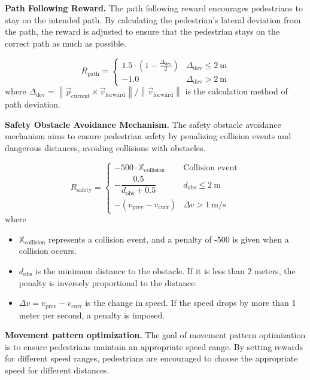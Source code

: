 \documentclass[lettersize,journal]{IEEEtran}
\begin{document}
\textbf{Path Following Reward.}
%
The path following reward encourages pedestrians to stay on the intended path. 
By calculating the pedestrian's lateral deviation from the path, the reward is adjusted to ensure that the pedestrian stays on the correct path as much as possible.

\begin{equation}
	R_{\text{path}} =
	\begin{cases}
		1.5 \cdot \left(1 - \frac{\Delta_{\text{dev}}}{2}\right) & \Delta_{\text{dev}} \leq 2\ \text{m} \\
		-1.0 & \Delta_{\text{dev}} > 2\ \text{m}
	\end{cases}
\end{equation}
where \( \Delta_{\text{dev}} = \left\| \vec{p}_{\text{current}} \times \vec{v}_{\text{forward}} \right\| / \left\| \vec{v}_{\text{forward}} \right\| \) is the calculation method of path deviation.



\textbf{Safety Obstacle Avoidance Mechanism.}
The safety obstacle avoidance mechanism aims to ensure pedestrian safety by penalizing collision events and dangerous distances, avoiding collisions with obstacles.

\begin{equation}
	R_{\text{safety}} =
	\begin{cases}
		-500 \cdot \mathbb{X}_{\text{collision}} & \text{Collision event} \\
		-\dfrac{0.5}{d_{\text{obs}} + 0.5} & d_{\text{obs}} \leq 2\ \text{m} \\
		-(v_{\text{prev}} - v_{\text{curr}}) & \Delta v > 1\ \text{m/s}
	\end{cases}
\end{equation}
where
\begin{itemize}
	\item \( \mathbb{X}_{\text{collision}} \) represents a collision event, and a penalty of -500 is given when a collision occurs.
	\item \( d_{\text{obs}} \) is the minimum distance to the obstacle. If it is less than 2 meters, the penalty is inversely proportional to the distance.
	\item \( \Delta v = v_{\text{prev}} - v_{\text{curr}} \) is the change in speed. If the speed drops by more than 1 meter per second, a penalty is imposed.
\end{itemize}


\textbf{Movement pattern optimization.}
%
The goal of movement pattern optimization is to ensure pedestrians maintain an appropriate speed range. By setting rewards for different speed ranges, pedestrians are encouraged to choose the appropriate speed for different distances.
\end{document}
